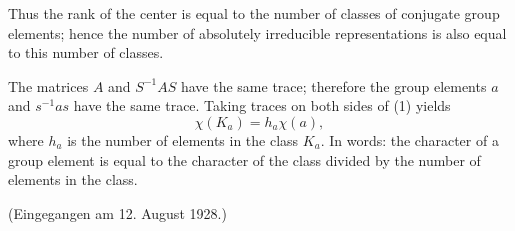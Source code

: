 \documentclass[11pt]{article}
\begin{document}
Thus the rank of the center is equal to the number of classes of conjugate group elements; hence the number of absolutely irreducible representations is also equal to this number of classes.

The matrices $A$ and $S^{-1}AS$ have the same trace; therefore the group elements $a$ and $s^{-1}as$ have the same trace. Taking traces on both sides of (1) yields
\[
        \chi(K_a)=h_a\chi(a),
\]
where $h_a$ is the number of elements in the class $K_a$. In words: the character of a group element is equal to the character of the class divided by the number of elements in the class.

\begin{center}
(Eingegangen am 12. August 1928.)
\end{center}
\end{document}
